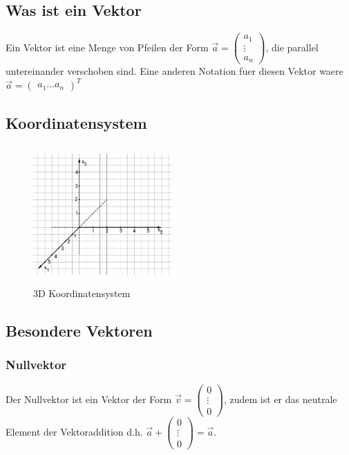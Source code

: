 \documentclass[a4paper]{article} %
\begin{document}
	\subsection{Was ist ein Vektor}
	Ein Vektor ist eine Menge von Pfeilen der Form $\vec{a} = \begin{pmatrix} a_1 \\ \vdots \\ a_n \end{pmatrix} $, die parallel untereinander verschoben sind.
	Eine anderen Notation fuer diesen Vektor waere $\vec{a} = \begin{pmatrix} a_1  \hdots  a_n \end{pmatrix}^T $
	\subsection{Koordinatensystem}
	\begin{minipage}{0.5\textwidth}
			\begin{figure}[H]
				\includegraphics[width=200px, height=200px]{koordinatensystem.png}
					\captionsetup{labelformat=empty}
				\caption{3D Koordinatensystem}
			\end{figure}
		\end{minipage}
	\subsection{Besondere Vektoren}
	\subsubsection{Nullvektor}
	Der Nullvektor ist ein Vektor der Form $\vec{v} = \begin{pmatrix} 0 \\ \vdots \\ 0 \end{pmatrix}$,
	 zudem ist er das neutrale Element der Vektoraddition d.h. $ \vec{a} + \begin{pmatrix} 0 \\ \vdots \\ 0 \end{pmatrix} = \vec{a}$.
\end{document}
